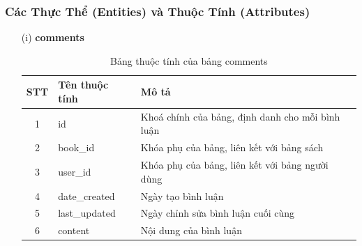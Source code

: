 \documentclass[../DoAn.tex]{subfiles}
\begin{document}
\subsubsection{Các Thực Thể (Entities) và Thuộc Tính (Attributes)}
\begin{enumerate}
    \item[(i)] \textbf{comments}
    \begin{table}[H]
    \centering
        \begin{tabular}{|c|m{4cm}|m{8cm}|}
        \hline
        \textbf{STT} & \textbf{Tên thuộc tính} & \textbf{Mô tả} \\
        \hline
        1 & id & Khoá chính của bảng, định danh cho mỗi bình luận \\
        \hline
        2 & book\_id & Khóa phụ của bảng, liên kết với bảng sách \\
        \hline
        3 & user\_id & Khóa phụ của bảng, liên kết với bảng người dùng \\
        \hline
        4 & date\_created & Ngày tạo bình luận \\
        \hline
        5 & last\_updated & Ngày chỉnh sửa bình luận cuối cùng \\
        \hline
        6 & content & Nội dung của bình luận \\
        \hline
        \end{tabular}
        \caption{Bảng thuộc tính của bảng comments}
        \label{tab:comments_attributes}
    \end{table}


\end{enumerate}
\end{document}
